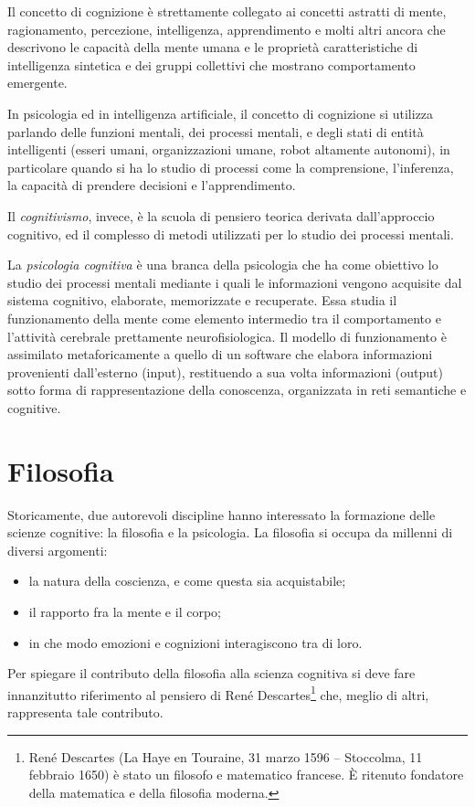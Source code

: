 Il concetto di cognizione è strettamente collegato ai concetti astratti di mente, ragionamento, percezione, intelligenza, apprendimento e molti altri ancora che descrivono le capacità della mente umana e le proprietà caratteristiche di intelligenza sintetica e dei gruppi collettivi che mostrano comportamento emergente.

In psicologia ed in intelligenza artificiale, il concetto di cognizione si utilizza parlando delle funzioni mentali, dei processi mentali, e degli stati di entità intelligenti (esseri umani, organizzazioni umane, robot altamente autonomi), in particolare quando si ha lo studio di processi come la comprensione, l'inferenza, la capacità di prendere decisioni e l'apprendimento.

Il \emph{cognitivismo}, invece, è la scuola di pensiero teorica derivata dall'approccio cognitivo, ed il complesso di metodi utilizzati per lo studio dei processi mentali.

La \emph{psicologia cognitiva} è una branca della psicologia che ha come obiettivo lo studio dei processi mentali mediante i quali le informazioni vengono acquisite dal sistema cognitivo, elaborate, memorizzate e recuperate. Essa studia il funzionamento della mente come elemento intermedio tra il comportamento e l'attività cerebrale prettamente neurofisiologica. Il modello di funzionamento è assimilato metaforicamente a quello di un software che elabora informazioni provenienti dall'esterno (input), restituendo a sua volta informazioni (output) sotto forma di rappresentazione della conoscenza, organizzata in reti semantiche e cognitive.

\section{Filosofia}
Storicamente, due autorevoli discipline hanno interessato la formazione delle scienze cognitive: la filosofia e la psicologia.
La filosofia si occupa da millenni di diversi argomenti:
\begin{itemize}
  \item la natura della coscienza, e come questa sia acquistabile;
  \item il rapporto fra la mente e il corpo;
  \item in che modo emozioni e cognizioni interagiscono tra di loro.
\end{itemize}
Per spiegare il contributo della filosofia alla scienza cognitiva si deve fare innanzitutto riferimento al pensiero di René Descartes\footnote{René Descartes (La Haye en Touraine, 31 marzo 1596 – Stoccolma, 11 febbraio 1650) è stato un filosofo e matematico francese. È ritenuto fondatore della matematica e della filosofia moderna.} che, meglio di altri, rappresenta tale contributo.

